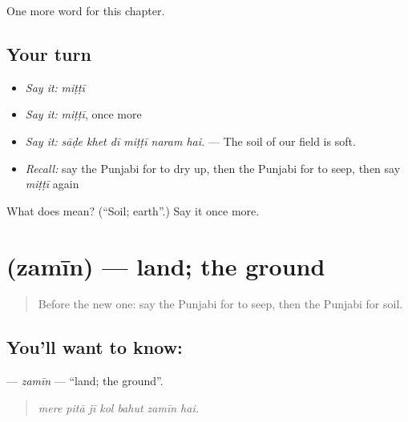 \begin{grammarlens}[title={What you've built}]
One more word for this chapter.
\end{grammarlens}

\subsection*{Your turn}
\begin{itemize}
\raggedright
  \item \emph{Say it:} \emph{miṭṭī}
  \item \emph{Say it:} \emph{miṭṭī}, once more
  \item \emph{Say it:} \emph{sāḍe khet dī miṭṭī naram hai.} — The soil of our field is soft.
  \item \emph{Recall:} say the Punjabi for to dry up, then the Punjabi for to seep, then say \emph{miṭṭī} again
\end{itemize}

\begin{tcolorbox}[breakable,colback=teal!4,colframe=teal!35!black,title={Before you move on}]
What does  mean? (\textquotedblleft{}Soil; earth\textquotedblright{}.) Say it once more.
\end{tcolorbox}
\section[\texorpdfstring{\pa{ਜ਼ਮੀਨ} (zamīn)}{ਜ਼ਮੀਨ (zamīn)}]{ (zamīn) — land; the ground}

\label{lesson:PA-C293-zamin}



\begin{quote}
Before the new one: say the Punjabi for to seep, then the Punjabi for soil.
\end{quote}

\subsection*{You'll want to know: }
\textbf{} — \emph{zamīn} — \textquotedblleft{}land; the ground\textquotedblright{}.

\begin{quote}
      
\end{quote}

\begin{quote}
\emph{mere pitā jī kol bahut zamīn hai.}
\end{quote}

